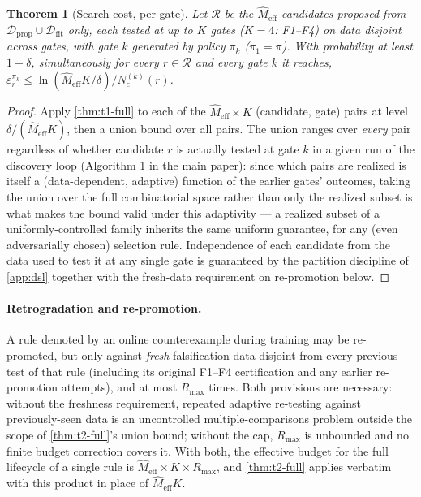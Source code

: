 \documentclass[11pt]{article}
\theoremstyle{plain}
\newtheorem{theorem}{Theorem}[section]
\theoremstyle{definition}
\theoremstyle{remark}
\begin{document}
\begin{theorem}[Search cost, per gate]
\label{thm:t2-full}
Let $\mathcal{R}$ be the $\hat M_{\mathrm{eff}}$ candidates proposed from $\mathcal{D}_{\mathrm{prop}}\cup\mathcal{D}_{\mathrm{fit}}$ only, each tested at up to $K$ gates ($K=4$: F1--F4) on data disjoint across gates, with gate $k$ generated by policy $\pi_k$ ($\pi_1=\pi$). With probability at least $1-\delta$, simultaneously for every $r\in\mathcal{R}$ and every gate $k$ it reaches, $\varepsilon^{\pi_k}_r \le \ln(\hat M_{\mathrm{eff}} K/\delta)/N_c^{(k)}(r)$.
\end{theorem}
\begin{proof}
Apply \autoref{thm:t1-full} to each of the $\hat M_{\mathrm{eff}}\times K$ (candidate, gate) pairs at level $\delta/(\hat M_{\mathrm{eff}}K)$, then a union bound over all pairs. The union ranges over \emph{every} pair regardless of whether candidate $r$ is actually tested at gate $k$ in a given run of the discovery loop (Algorithm 1 in the main paper): since which pairs are realized is itself a (data-dependent, adaptive) function of the earlier gates' outcomes, taking the union over the full combinatorial space rather than only the realized subset is what makes the bound valid under this adaptivity --- a realized subset of a uniformly-controlled family inherits the same uniform guarantee, for any (even adversarially chosen) selection rule. Independence of each candidate from the data used to test it at any single gate is guaranteed by the partition discipline of \autoref{app:dsl} together with the fresh-data requirement on re-promotion below.
\end{proof}

\paragraph{Retrogradation and re-promotion.} A rule demoted by an online counterexample during training may be re-promoted, but only against \emph{fresh} falsification data disjoint from every previous test of that rule (including its original F1--F4 certification and any earlier re-promotion attempts), and at most $R_{\max}$ times. Both provisions are necessary: without the freshness requirement, repeated adaptive re-testing against previously-seen data is an uncontrolled multiple-comparisons problem outside the scope of \autoref{thm:t2-full}'s union bound; without the cap, $R_{\max}$ is unbounded and no finite budget correction covers it. With both, the effective budget for the full lifecycle of a single rule is $\hat M_{\mathrm{eff}}\times K\times R_{\max}$, and \autoref{thm:t2-full} applies verbatim with this product in place of $\hat M_{\mathrm{eff}}K$.
\end{document}
